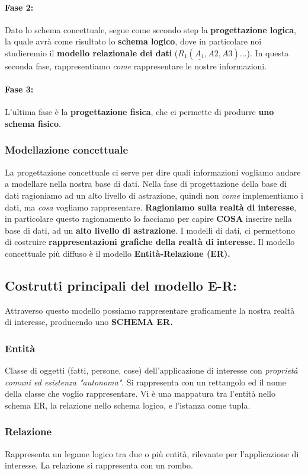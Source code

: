 \documentclass{article}
\begin{document}
\paragraph{Fase 2:}
Dato lo schema concettuale, segue come secondo step la \textbf{progettazione logica}, la quale avrà come risultato lo \textbf{schema logico}, dove in particolare noi studieremio il \textbf{modello relazionale dei dati} ($R_1(\underline{A_1},A2,A3)...$). In questa seconda fase, rappresentiamo \textit{come} rappresentare le nostre informazioni. 
\paragraph{Fase 3:}
L'ultima fase è la \textbf{progettazione fisica}, che ci permette di produrre \textbf{uno schema fisico}.

\subsubsection{Modellazione concettuale}
La progettazione concettuale ci serve per dire quali informazioni vogliamo andare a modellare nella nostra base di dati. Nella fase di progettazione della base di dati ragioniamo ad un alto livello di astrazione, quindi non \textit{come} implementiamo i dati, ma \textit{cosa} vogliamo rappresentare. \textbf{Ragioniamo sulla realtà di interesse}, in particolare questo ragionamento lo facciamo per capire \textbf{COSA} inserire nella base di dati, ad un \textbf{alto livello di astrazione}. I modelli di dati, ci permettono di costruire \textbf{rappresentazioni grafiche della realtà di interesse.} Il modello concettuale più diffuso è il modello \textbf{Entità-Relazione (ER).}
\subsection{Costrutti principali del modello E-R:} Attraverso questo modello possiamo rappresentare graficamente la nostra realtà di interesse, producendo uno \textbf{SCHEMA ER.}
\subsubsection{Entità} Classe di oggetti (fatti, persone, cose) dell'applicazione di interesse con \textit{proprietà comuni ed esistenza "autonoma"}. Si rappresenta con un rettangolo ed il nome della classe che voglio rappresentare.
Vi è una mappatura tra l'entità nello schema ER, la relazione nello schema logico, e l'istanza come tupla.
\subsubsection{Relazione} Rappresenta un legame logico tra due o più entità, rilevante per l'applicazione di interesse. La relazione si rappresenta con un rombo.
\end{document}
